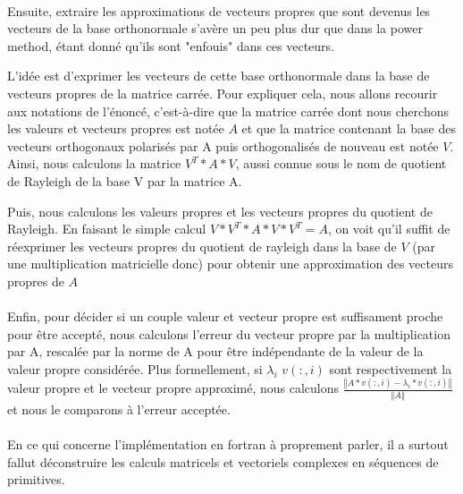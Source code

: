 \documentclass[a4paper,12pt]{article}
\newcommand{\norme}[1]{\left\Vert #1\right\Vert}
\begin{document}
    \paragraph{}
    Ensuite, extraire les approximations de vecteurs propres que sont devenus
    les vecteurs de la base orthonormale s'avère un peu plus dur que dans la
    power method, étant donné qu'ils sont "enfouis" dans ces vecteurs.

    L'idée est d'exprimer les vecteurs de cette base orthonormale dans la
    base de vecteurs propres de la matrice carrée. Pour expliquer cela, nous
    allons recourir aux notations de l'énoncé, c'est-à-dire que la matrice
    carrée dont nous cherchons les valeurs et vecteurs propres est notée $A$
    et que la matrice contenant la base des vecteurs orthogonaux polarisés
    par A puis orthogonalisés de nouveau est notée $V$. Ainsi, nous calculons
    la matrice $V^T*A*V$, aussi connue sous le nom de quotient de Rayleigh de
    la base V par la matrice A.

    Puis, nous calculons les valeurs propres et les vecteurs propres du quotient
    de Rayleigh. En faisant le simple calcul $V*V^T*A*V*V^T = A$, on voit qu'il
    suffit de réexprimer les vecteurs propres du quotient de rayleigh dans la base
    de $V$ (par une multiplication matricielle donc) pour obtenir une approximation
    des vecteurs propres de $A$

    \paragraph{}
    Enfin, pour décider si un couple valeur et vecteur propre est suffisament proche
    pour être accepté, nous calculons l'erreur du vecteur propre par la multiplication
    par A, rescalée par la norme de A pour être indépendante de la valeur de la
    valeur propre considérée. Plus formellement, si $\lambda_i$ $v(:,i)$ sont
    respectivement la valeur propre et le vecteur propre approximé, nous calculons
    $\frac{\norme{A*v(:,i) - \lambda_i*v(:,i)}}{\norme{A}}$ et nous le comparons
    à l'erreur acceptée.

    \bigskip
    \paragraph{}
    En ce qui concerne l'implémentation en fortran à proprement parler, il a surtout
    fallut déconstruire les calculs matricels et vectoriels complexes en séquences
    de primitives.
\end{document}
